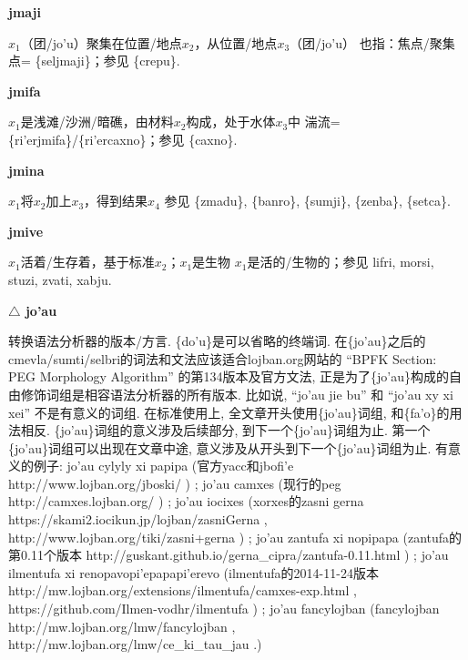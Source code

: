 \documentclass[notitlepage,twocolumn,a4paper,10pt]{book}
\begin{document}
{\sffamily\bfseries jmaji}\enspace {\ttfamily\bfseries[jaj]}  $x_1$（团\slash{}jo'u）聚集在位置\slash{}地点$x_2$，从位置\slash{}地点$x_3$（团\slash{}jo'u） \textemdash{} 也指：焦点\slash{}聚集点= \{seljmaji\}；参见 \{crepu\}.

{\sffamily\bfseries jmifa} $x_1$是浅滩\slash{}沙洲\slash{}暗礁，由材料$x_2$构成，处于水体$x_3$中 \textemdash{} 湍流= \{ri'erjmifa\}\slash{}\{ri'ercaxno\}；参见 \{caxno\}.

{\sffamily\bfseries jmina}\enspace {\ttfamily\bfseries[min]}  $x_1$将$x_2$加上$x_3$，得到结果$x_4$ \textemdash{} 参见 \{zmadu\}, \{banro\}, \{sumji\}, \{zenba\}, \{setca\}.

{\sffamily\bfseries jmive}\enspace {\ttfamily\bfseries[miv     ji'e]}  $x_1$活着\slash{}生存着，基于标准$x_2$；$x_1$是生物 \textemdash{} $x_1$是活的\slash{}生物的；参见 {lifri}, {morsi}, {stuzi}, {zvati}, {xabju}.

{\sffamily\bfseries $\triangle$ jo'au}\enspace {\sffamily\bfseries[COI3]}  转换语法分析器的版本\slash{}方言. \textemdash{} \{do'u\}是可以省略的终端词. 在\{jo'au\}之后的cmevla\slash{}sumti\slash{}selbri的词法和文法应该适合lojban.org网站的 ``BPFK Section: PEG Morphology Algorithm'' 的第134版本及官方文法, 正是为了\{jo'au\}构成的自由修饰词组是相容语法分析器的所有版本. 比如说, ``jo'au jie bu'' 和 ``jo'au xy xi xei'' 不是有意义的词组. 在标准使用上, 全文章开头使用\{jo'au\}词组, 和\{fa'o\}的用法相反. \{jo'au\}词组的意义涉及后续部分, 到下一个\{jo'au\}词组为止. 第一个\{jo'au\}词组可以出现在文章中途, 意义涉及从开头到下一个\{jo'au\}词组为止. 有意义的例子: jo'au cylyly xi papipa (官方yacc和jbofi'e http:\slash{}\slash{}www.lojban.org\slash{}jboski\slash{} ) ; jo'au camxes (现行的peg http:\slash{}\slash{}camxes.lojban.org\slash{} ) ; jo'au iocixes (xorxes的zasni gerna https:\slash{}\slash{}skami2.iocikun.jp\slash{}lojban\slash{}zasniGerna , http:\slash{}\slash{}www.lojban.org\slash{}tiki\slash{}zasni+gerna ) ; jo'au zantufa xi nopipapa (zantufa的第0.11个版本 http:\slash{}\slash{}guskant.github.io\slash{}gerna\_cipra\slash{}zantufa-0.11.html ) ; jo'au ilmentufa xi renopavopi'epapapi'erevo (ilmentufa的2014-11-24版本 http:\slash{}\slash{}mw.lojban.org\slash{}extensions\slash{}ilmentufa\slash{}camxes-exp.html , https:\slash{}\slash{}github.com\slash{}Ilmen-vodhr\slash{}ilmentufa ) ; jo'au fancylojban (fancylojban http:\slash{}\slash{}mw.lojban.org\slash{}lmw\slash{}fancylojban , http:\slash{}\slash{}mw.lojban.org\slash{}lmw\slash{}ce\_ki\_tau\_jau .)
\end{document}

